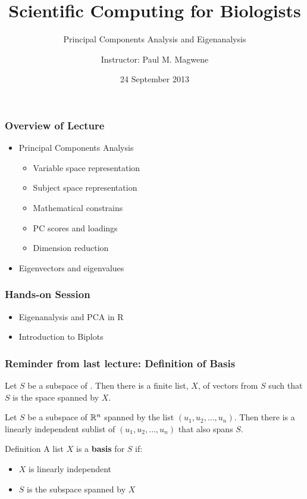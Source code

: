 \documentclass{beamer}
\title{Scientific Computing for Biologists}
\subtitle{Principal Components Analysis and Eigenanalysis} %
\author{Instructor: Paul M. Magwene}
\date{24 September 2013}
\begin{document}
\begin{frame}
\titlepage
\end{frame}

\begin{frame}
  \frametitle{Overview of Lecture}
  
\begin{itemize}
		\item Principal Components Analysis
		\begin{itemize}
			\item Variable space representation
			\item Subject space representation
			\item Mathematical constrains
			\item PC scores and loadings
			\item Dimension reduction			
		\end{itemize}		
		\item Eigenvectors and eigenvalues	
\end{itemize}

\end{frame}

\begin{frame}
  \frametitle{Hands-on Session}
\begin{itemize}
    \item Eigenanalysis and PCA in R
    \item Introduction to Biplots
\end{itemize} 


\end{frame}		




\begin{frame}
  \frametitle{Reminder from last lecture: Definition of Basis}

Let $S$ be a subspace of \RealN.  Then there is a finite list, $X$, of vectors from $S$ such that $S$ is the space spanned by $X$.
\medskip

Let $S$ be a subspace of $\mathbb{R}^n$ spanned by the list $(u_1, u_2, \ldots, u_n)$. Then  there is a linearly independent sublist of $(u_1, u_2, \ldots, u_n)$ that also spans $S$.
\medskip

\begin{block}{Definition}
A list $X$ is a \textbf{basis} for $S$ if:
\begin{itemize}
\item $X$ is linearly independent
\item $S$ is the subspace spanned by $X$
\end{itemize}
\end{block}

\end{frame}
\end{document}
